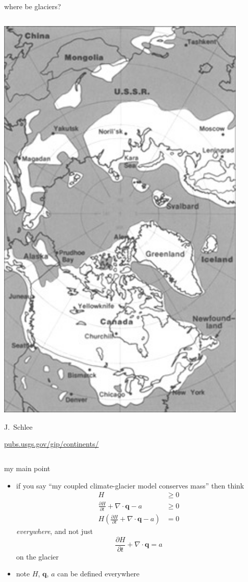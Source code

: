 \documentclass[10pt,hyperref,dvipsnames]{beamer}
\newcommand{\bq}{\mathbf{q}}
\newcommand{\Div}{\nabla\cdot}
\begin{document}
\begin{frame}{where be glaciers?}
\begin{columns}
\begin{column}{0.35\textwidth}
\hfill \includegraphics[width=0.9\textwidth]{figs/Pleistocene_north_ice_map.jpg}

\tiny

\hfill J.~Schlee

\hfill \mbox{\url{pubs.usgs.gov/gip/continents/}}
\end{column}
\end{columns}
\end{frame}


\begin{frame}{my main point}
\begin{itemize}
\item if you say ``my coupled climate-glacier model conserves mass'' then think
\begin{align*}
H &\ge 0 \\
\frac{\partial H}{\partial t} + \Div \bq - a &\ge 0 \\
H \left(\frac{\partial H}{\partial t} + \Div \bq - a\right) &= 0
\end{align*}
\emph{everywhere}, and not just
    $$\frac{\partial H}{\partial t} + \Div \bq = a$$
on the glacier

\medskip
\item<2> note $H$, $\bq$, $a$ can be defined everywhere
\end{itemize}
\end{frame}
\end{document}
